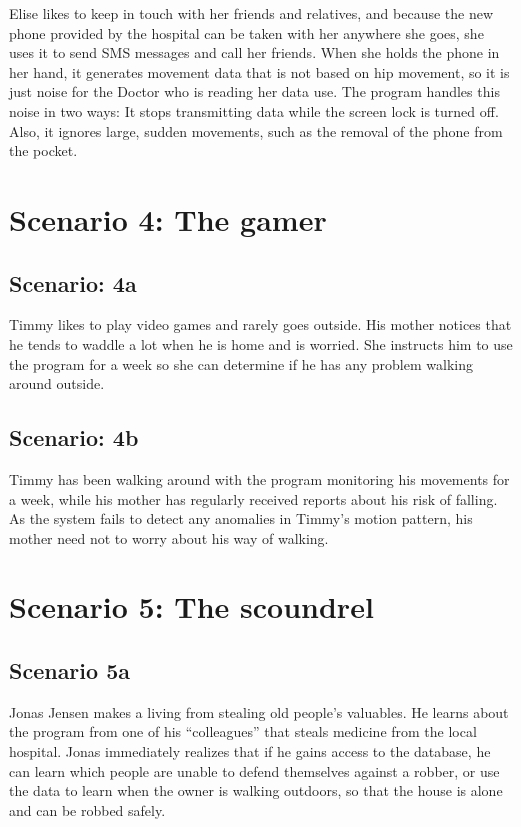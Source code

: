 Elise likes to keep in touch with her friends and relatives, and because the new phone provided by the hospital can be taken with her anywhere she goes, she uses it to send SMS messages and call her friends. When she holds the phone in her hand, it generates movement data that is not based on hip movement, so it is just noise for the Doctor who is reading her data use. 
The program handles this noise in two ways: It stops transmitting data while the screen lock is turned off. Also, it ignores large, sudden movements, such as the removal of the phone from the pocket.

\section{Scenario 4: The gamer}

\subsection*{Scenario: 4a}

Timmy likes to play video games and rarely goes outside. His mother notices that he tends to waddle a lot when he is home and is worried. She instructs him to use the program for a week so she can determine if he has any problem walking around outside.

\subsection*{Scenario: 4b}

Timmy has been walking around with the program monitoring his movements for a week, while his mother has regularly received reports about his risk of falling. As the system fails to detect any anomalies in Timmy’s motion pattern, his mother need not to worry about his way of walking.

\section{Scenario 5: The scoundrel}

\subsection*{Scenario 5a}

Jonas Jensen makes a living from stealing old people’s valuables. He learns about the program from one of his “colleagues” that steals medicine from the local hospital. Jonas immediately realizes that if he gains access to the database, he can learn which people are unable to defend themselves against a robber, or use the data to learn when the owner is walking outdoors, so that the house is alone and can be robbed safely. 





